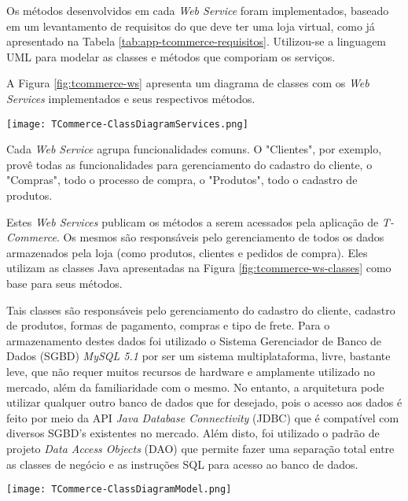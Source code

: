 Os métodos desenvolvidos em cada \textit{Web Service} foram implementados, baseado em um levantamento de requisitos
do que deve ter uma loja virtual, como já apresentado na Tabela \ref{tab:app-tcommerce-requisitos}. 
Utilizou-se a linguagem UML para modelar as classes e métodos
que comporiam os serviços.

A Figura \ref{fig:tcommerce-ws} apresenta um diagrama de classes com os \textit{Web Services}
implementados e seus respectivos métodos.

\begin{center}
	\texttt{[image: TCommerce-ClassDiagramServices.png]}
	\label{fig:tcommerce-ws}
\end{center}

Cada \textit{Web Service} agrupa funcionalidades comuns. O "Clientes", por exemplo,
provê todas as funcionalidades para gerenciamento do cadastro do cliente, o "Compras",
todo o processo de compra, o "Produtos", todo o cadastro de produtos.

Estes \textit{Web Services} publicam os métodos a serem acessados pela aplicação de \textit{T-Commerce}.
Os mesmos são responsáveis pelo gerenciamento de todos os dados armazenados pela loja (como produtos, clientes
e pedidos de compra). Eles utilizam as classes Java apresentadas na Figura \ref{fig:tcommerce-ws-classes}
como base para seus métodos.

Tais classes são responsáveis pelo gerenciamento do cadastro do cliente, cadastro de produtos,
formas de pagamento, compras e tipo de frete. Para o armazenamento destes
dados foi utilizado o Sistema Gerenciador de Banco de Dados (SGBD) \textit{MySQL 5.1}
por ser um sistema multiplataforma, livre, bastante leve, que não requer
muitos recursos de hardware e amplamente utilizado no mercado, além
da familiaridade com o mesmo. No entanto, a arquitetura pode utilizar qualquer outro
banco de dados que for desejado, pois o acesso aos dados
é feito por meio da API \textit{Java Database Connectivity} (JDBC)
que é compatível com diversos SGBD's existentes no mercado. Além disto,
foi utilizado o padrão de projeto \textit{Data Access Objects} (DAO)
que permite fazer uma separação total entre as classes de negócio e as instruções
SQL para acesso ao banco de dados.

\begin{center}
	\texttt{[image: TCommerce-ClassDiagramModel.png]}
	\label{fig:tcommerce-ws-classes}
\end{center}


